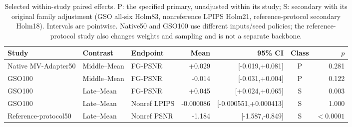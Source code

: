 \documentclass[times,twocolumn,final]{elsarticle}
\providecommand{\DIFaddbegin}{} %
\providecommand{\DIFaddend}{} %
\providecommand{\DIFdelbegin}{} %
\providecommand{\DIFdelend}{} %
\begin{document}
\DIFdelbegin %
\DIFdelend \DIFaddbegin \begin{table}[t]\centering\scriptsize\setlength{\tabcolsep}{3pt}
\caption{Selected within-study paired effects. P: the specified primary, unadjusted within its study; S: secondary with its original family adjustment (GSO all-six Holm83, nonreference LPIPS Holm21, reference-protocol secondary Holm18). Intervals are pointwise. Native50 and GSO100 use different inputs/seed policies; the reference-protocol study also changes weights and sampling and is not a separate backbone.}
\label{tab:interface-effects}
\begin{tabular}{lllrrcr}
\toprule Study & Contrast & Endpoint & Mean & 95\% CI & Class & $p$ \\
\midrule
Native MV-Adapter50 & Middle--Mean & FG-PSNR & +0.029 & [-0.019,+0.081] & P & 0.281 \\
GSO100 & Middle--Mean & FG-PSNR & -0.014 & [-0.031,+0.004] & P & 0.122 \\
GSO100 & Late--Mean & FG-PSNR & +0.045 & [+0.024,+0.065] & S & 0.003 \\
GSO100 & Late--Mean & Nonref LPIPS & -0.000086 & [-0.000551,+0.000413] & S & 1.000 \\
Reference-protocol50 & Late--Mean & Nonref PSNR & -1.184 & [-1.587,-0.849] & S & $<0.0001$ \\

\bottomrule\end{tabular}\end{table}
\DIFaddend 
\end{document}
